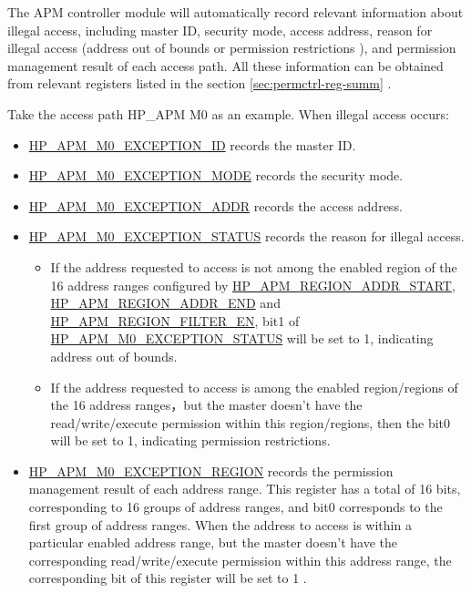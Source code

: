 \documentclass[main\_\_EN.tex]{subfiles}
\begin{document}
The APM controller module will automatically record relevant information about illegal access, including master ID, security mode, access address, reason for illegal access (address out of bounds or permission restrictions ), and permission management result of each access path. All these information can be obtained from relevant registers listed in the section \ref{sec:permctrl-reg-summ} \textit{}.


Take the access path HP\_APM M0 as an example. When illegal access occurs:

\begin{itemize}
    \item \hyperref[fielddesc:HPAPMM0EXCEPTIONID]{HP\_APM\_M0\_EXCEPTION\_ID} records the master ID.
    \item \hyperref[fielddesc:HPAPMM0EXCEPTIONMODE]{HP\_APM\_M0\_EXCEPTION\_MODE} records the security mode.
    \item \hyperref[fielddesc:HPAPMM0EXCEPTIONADDR]{HP\_APM\_M0\_EXCEPTION\_ADDR} records the access address.
    \item \hyperref[fielddesc:HPAPMM0EXCEPTIONSTATUS]{HP\_APM\_M0\_EXCEPTION\_STATUS} records the reason for illegal access. 
    \begin{itemize}
        \item If the address requested to access is not among the enabled region of the 16 address ranges configured by \hyperref[regdesc:HPAPMREGION0ADDRSTARTREG]{HP\_APM\_REGION\_ADDR\_START}, \hyperref[regdesc:HPAPMREGION0ADDRENDREG]{HP\_APM\_REGION\_ADDR\_END} and \hyperref[fielddesc:HPAPMREGIONFILTEREN]{HP\_APM\_REGION\_FILTER\_EN}, bit1 of \hyperref[fielddesc:HPAPMM0EXCEPTIONSTATUS]{HP\_APM\_M0\_EXCEPTION\_STATUS} will be set to 1, indicating address out of bounds.
        \item If the address requested to access is among the enabled region/regions of the 16 address ranges，but the master doesn't have the read/write/execute permission within this region/regions, then the bit0 will be set to 1, indicating permission restrictions.
    \end{itemize}

    \item \hyperref[fielddesc:HPAPMM0EXCEPTIONREGION]{HP\_APM\_M0\_EXCEPTION\_REGION} records the permission management result of each address range. This register has a total of 16 bits, corresponding to 16 groups of address ranges, and bit0 corresponds to the first group of address ranges. When the address to access is within a particular enabled address range, but the master doesn't have the corresponding read/write/execute permission within this address range, the corresponding bit of this register will be set to 1 .

\end{itemize}
\end{document}
